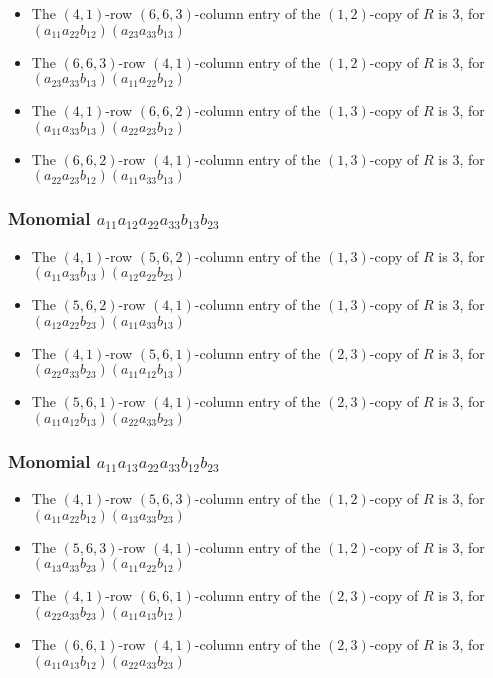 \documentclass{article}
\begin{document}
\begin{itemize}
\item The $(4, 1)$-row $(6, 6, 3)$-column entry of the $ \left(1, 2\right) $-copy of $R$ is $ 3 $, for $( a_{11} a_{22} b_{12} )( a_{23} a_{33} b_{13} )$ 
\item The $(6, 6, 3)$-row $(4, 1)$-column entry of the $ \left(1, 2\right) $-copy of $R$ is $ 3 $, for $( a_{23} a_{33} b_{13} )( a_{11} a_{22} b_{12} )$ 
\item The $(4, 1)$-row $(6, 6, 2)$-column entry of the $ \left(1, 3\right) $-copy of $R$ is $ 3 $, for $( a_{11} a_{33} b_{13} )( a_{22} a_{23} b_{12} )$ 
\item The $(6, 6, 2)$-row $(4, 1)$-column entry of the $ \left(1, 3\right) $-copy of $R$ is $ 3 $, for $( a_{22} a_{23} b_{12} )( a_{11} a_{33} b_{13} )$ 
\end{itemize}
\subsubsection{Monomial $ a_{11} a_{12} a_{22} a_{33} b_{13} b_{23} $}

\begin{itemize}
\item The $(4, 1)$-row $(5, 6, 2)$-column entry of the $ \left(1, 3\right) $-copy of $R$ is $ 3 $, for $( a_{11} a_{33} b_{13} )( a_{12} a_{22} b_{23} )$ 
\item The $(5, 6, 2)$-row $(4, 1)$-column entry of the $ \left(1, 3\right) $-copy of $R$ is $ 3 $, for $( a_{12} a_{22} b_{23} )( a_{11} a_{33} b_{13} )$ 
\item The $(4, 1)$-row $(5, 6, 1)$-column entry of the $ \left(2, 3\right) $-copy of $R$ is $ 3 $, for $( a_{22} a_{33} b_{23} )( a_{11} a_{12} b_{13} )$ 
\item The $(5, 6, 1)$-row $(4, 1)$-column entry of the $ \left(2, 3\right) $-copy of $R$ is $ 3 $, for $( a_{11} a_{12} b_{13} )( a_{22} a_{33} b_{23} )$ 
\end{itemize}
\subsubsection{Monomial $ a_{11} a_{13} a_{22} a_{33} b_{12} b_{23} $}

\begin{itemize}
\item The $(4, 1)$-row $(5, 6, 3)$-column entry of the $ \left(1, 2\right) $-copy of $R$ is $ 3 $, for $( a_{11} a_{22} b_{12} )( a_{13} a_{33} b_{23} )$ 
\item The $(5, 6, 3)$-row $(4, 1)$-column entry of the $ \left(1, 2\right) $-copy of $R$ is $ 3 $, for $( a_{13} a_{33} b_{23} )( a_{11} a_{22} b_{12} )$ 
\item The $(4, 1)$-row $(6, 6, 1)$-column entry of the $ \left(2, 3\right) $-copy of $R$ is $ 3 $, for $( a_{22} a_{33} b_{23} )( a_{11} a_{13} b_{12} )$ 
\item The $(6, 6, 1)$-row $(4, 1)$-column entry of the $ \left(2, 3\right) $-copy of $R$ is $ 3 $, for $( a_{11} a_{13} b_{12} )( a_{22} a_{33} b_{23} )$ 
\end{itemize}
\end{document}
